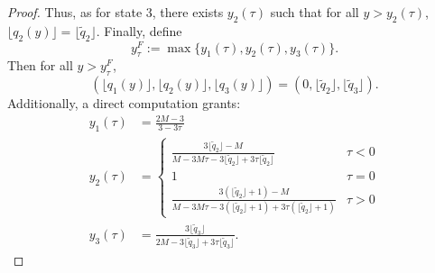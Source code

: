 \documentclass[10pt,a4paper]{amsart}
\begin{document}
\begin{proof}
Thus, as for state 3, there exists $y_2(\tau)$ such that for all $y > y_2(\tau)$,
$\lfloor q_2(y) \rfloor = \lfloor \tilde q_2 \rfloor.$
Finally, define
$$y_{\tau}^F := \max\{y_1(\tau), y_2(\tau), y_3(\tau)\}.$$
Then for all $y > y_{\tau}^F$,
$$(\lfloor q_1(y)\rfloor, \lfloor q_2(y)\rfloor, \lfloor q_3(y)\rfloor)
=\left(0, \lfloor \tilde q_2 \rfloor, \lfloor \tilde q_3 \rfloor\right).$$
Additionally, a direct computation grants:
\begin{align*}
y_1(\tau) &= \frac{2M-3}{3-3\tau}\\
y_2(\tau) &= \left\{ \begin{array}{lcl} \frac{3 \lfloor \tilde{q}_2 \rfloor -M}{M-3M\tau-3\lfloor \tilde{q}_2 \rfloor+3\tau \lfloor \tilde{q}_2 \rfloor} & \tau<0 \\ 1 &\tau=0 \\ \frac{3 (\lfloor \tilde{q}_2 \rfloor+1) -M}{M-3M\tau-3(\lfloor \tilde{q}_2 \rfloor+1)+3\tau (\lfloor\tilde{q}_2 \rfloor+1)} & \tau >0  \end{array} \right. \\
y_3(\tau) &= \frac{3 \lfloor \tilde{q}_3 \rfloor}{2M-3\lfloor \tilde{q}_3 \rfloor +3\tau\lfloor \tilde{q}_3 \rfloor}.
\end{align*}

\end{proof}
\end{document}
